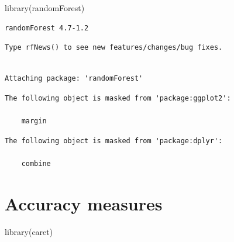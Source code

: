 \documentclass[
  letterpaper,
  DIV=11,
  numbers=noendperiod]{scrreprt}
\newenvironment{Shaded}{\begin{snugshade}}{\end{snugshade}}
\newcommand{\AttributeTok}[1]{\textcolor[rgb]{0.40,0.45,0.13}{#1}}
\newcommand{\ConstantTok}[1]{\textcolor[rgb]{0.56,0.35,0.01}{#1}}
\newcommand{\FunctionTok}[1]{\textcolor[rgb]{0.28,0.35,0.67}{#1}}
\newcommand{\NormalTok}[1]{\textcolor[rgb]{0.00,0.23,0.31}{#1}}
\newcommand{\OtherTok}[1]{\textcolor[rgb]{0.00,0.23,0.31}{#1}}
\newcommand{\SpecialCharTok}[1]{\textcolor[rgb]{0.37,0.37,0.37}{#1}}
\begin{document}
\begin{Shaded}
\begin{Highlighting}[]
\FunctionTok{library}\NormalTok{(randomForest)}
\end{Highlighting}
\end{Shaded}

\begin{verbatim}
randomForest 4.7-1.2
\end{verbatim}

\begin{verbatim}
Type rfNews() to see new features/changes/bug fixes.
\end{verbatim}

\begin{verbatim}

Attaching package: 'randomForest'
\end{verbatim}

\begin{verbatim}
The following object is masked from 'package:ggplot2':

    margin
\end{verbatim}

\begin{verbatim}
The following object is masked from 'package:dplyr':

    combine
\end{verbatim}

\begin{Shaded}
\end{Shaded}

\section{Accuracy measures}\label{accuracy-measures}

\begin{Shaded}
\begin{Highlighting}[]
\FunctionTok{library}\NormalTok{(caret)}
\end{Highlighting}
\end{Shaded}
\end{document}
